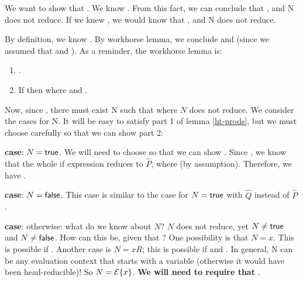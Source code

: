 \documentclass{article}
\begin{document}
We want to show that . We know . From this fact, we can conclude that , and N does not reduce. If we knew , we would know that , and N does not reduce. 

By definition, we know . By workhorse lemma, we conclude  and  (since we assumed that  and ). As a reminder, the workhorse lemma is:

\begin{lemma}\label{lem:workhorse}
\leavevmode %
\begin{enumerate}
\item {}   .
\item If \bnorm{\E} then  where  and .
\end{enumerate}
\end{lemma}

Now, since , there must exist N such that  where $N$ does not reduce. We consider the cases for N. It will be easy to satisfy part 1 of lemma \ref{ht-prods}, but we must choose carefully so that we can show part 2: 

\textbf{case}: $N = \mathsf{true}$. We will need to choose 
so that we can show .
Since , we know that the whole if expression
reduces to $\hat{P}$, where  (by assumption). Therefore, we have .

\textbf{case}: $N = \mathsf{false}$. This case is similar to the case for $N = \mathsf{true}$ with $\hat Q$ instead of $\hat P$.

\textbf{case}: otherwise: what do we know about $N$? $N$ does not reduce, yet $N \neq \mathsf{true}$ and $N \neq \mathsf{false}$. How can this be, given that ? One possibility is that $N = x$. This is possible if . Another case is $N = x R$; this is possible if  and . In general, N can be any evaluation context that starts with a variable (otherwise it would have been head-reducible)! So $N = \mathcal{E} \{ x \}$. \textbf{We will need to require that \bnorm{\E}}.
\end{document}
